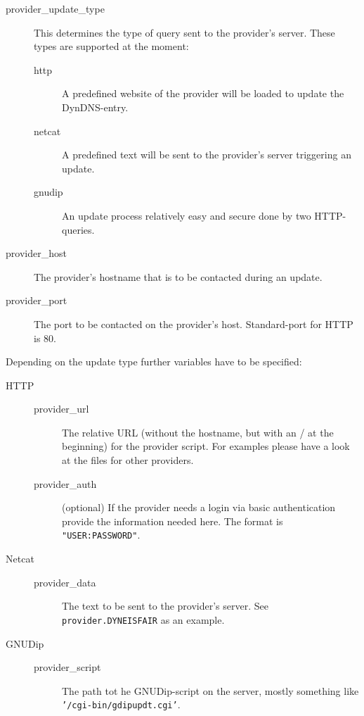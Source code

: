 \begin{description}
\item[provider\_update\_type] This determines the type of query sent to the 
	provider's server. These types are supported at the moment:
	\begin{description}
	\item[http] A predefined website of the provider will be loaded to 
		update the DynDNS-entry.
	\item[netcat] A predefined text will be sent to the provider's server 
		triggering an update.
	\item[gnudip] An update process relatively easy and secure done 
		by two HTTP-queries.
	\end{description}
\item[provider\_host] The provider's hostname that is to be contacted
	during an update.
\item[provider\_port] The port to be contacted on the provider's host. 
	Standard-port for HTTP is 80.
\end{description}

Depending on the update type further variables have to be specified:

\begin{description}
\item[HTTP]

\begin{description}
\item[provider\_url] The relative URL (without the hostname, but with an / at
	the beginning) for the provider script. For examples please have a look at 
	the files for other providers.
\item[provider\_auth] (optional) If the provider needs a login via 
	basic authentication provide the information needed here. 
	The format is \texttt{"{}USER:PASSWORD"{}}.
\end{description}

\item[Netcat]

\begin{description}
\item[provider\_data] The text to be sent to the provider's server. 
	See \texttt{provider.DYNEISFAIR} as an example.
\end{description}

\item[GNUDip]

\begin{description}
\item[provider\_script] The path tot he GNUDip-script on the server, mostly 
	something like \texttt{'/cgi-bin/gdipupdt.cgi'}.
\end{description}
\end{description}

